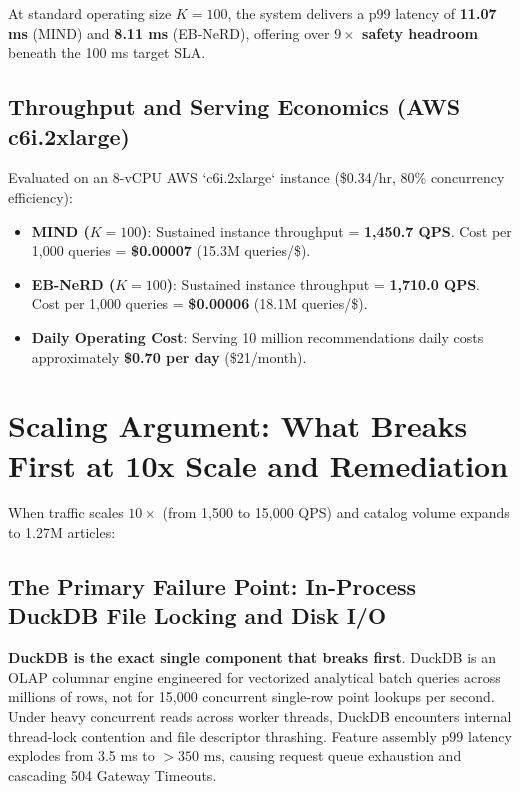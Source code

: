 \documentclass[11pt,a4paper]{article}
\begin{document}
\noindent At standard operating size $K = 100$, the system delivers a p99 latency of \textbf{11.07 ms} (MIND) and \textbf{8.11 ms} (EB-NeRD), offering over \textbf{$9\times$ safety headroom} beneath the 100 ms target SLA.

\subsection{Throughput and Serving Economics (AWS c6i.2xlarge)}
Evaluated on an 8-vCPU AWS `c6i.2xlarge` instance (\$0.34/hr, 80\% concurrency efficiency):
\begin{itemize}[itemsep=1pt]
    \item \textbf{MIND ($K=100$)}: Sustained instance throughput = \textbf{1,450.7 QPS}. Cost per 1,000 queries = \textbf{\$0.00007} (15.3M queries/\$).
    \item \textbf{EB-NeRD ($K=100$)}: Sustained instance throughput = \textbf{1,710.0 QPS}. Cost per 1,000 queries = \textbf{\$0.00006} (18.1M queries/\$).
    \item \textbf{Daily Operating Cost}: Serving 10 million recommendations daily costs approximately \textbf{\$0.70 per day} (\$21/month).
\end{itemize}

\section{Scaling Argument: What Breaks First at 10x Scale and Remediation}

When traffic scales $10\times$ (from 1,500 to 15,000 QPS) and catalog volume expands to 1.27M articles:

\subsection{The Primary Failure Point: In-Process DuckDB File Locking and Disk I/O}
\textbf{DuckDB is the exact single component that breaks first}. DuckDB is an OLAP columnar engine engineered for vectorized analytical batch queries across millions of rows, not for 15,000 concurrent single-row point lookups per second. Under heavy concurrent reads across worker threads, DuckDB encounters internal thread-lock contention and file descriptor thrashing. Feature assembly p99 latency explodes from 3.5 ms to $> 350\text{ ms}$, causing request queue exhaustion and cascading 504 Gateway Timeouts.
\end{document}
